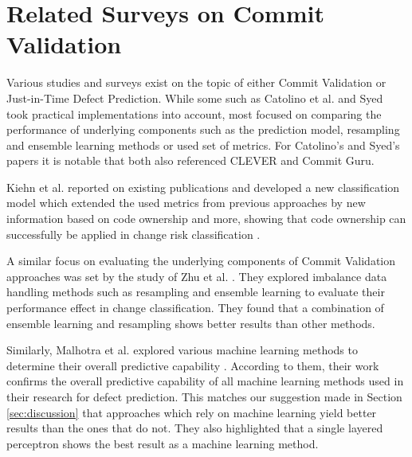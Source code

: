 \section{Related Surveys on Commit Validation}
\label{sec:relatedsurveys}

Various studies and surveys exist
on the topic of either Commit Validation or Just-in-Time Defect Prediction. While some such as Catolino et al. \cite{Catolino2019} and Syed \cite{Syed2019} took practical implementations into account, most focused on comparing the performance of underlying components such as the prediction model, resampling and ensemble learning methods or used set of metrics. For Catolino's and Syed's papers it is notable that both also referenced CLEVER and Commit Guru.

Kiehn et al. reported on existing publications and developed a new classification model which extended the used metrics from previous approaches by new information based on code ownership and more, showing that code ownership can successfully be applied in change risk classification \cite{Kiehn2019}.

A similar focus on evaluating the underlying components of Commit Validation approaches was set by the study of Zhu et al. \cite{Zhu2018}. They explored imbalance data handling methods such as resampling and ensemble learning to evaluate their performance effect in change classification. They found that a combination of ensemble learning and resampling shows better results than other methods. 

Similarly, Malhotra et al. explored various machine learning methods to determine their overall predictive capability \cite{Malhotra2017}. According to them, their work confirms the overall predictive capability of all machine learning methods used in their research for defect prediction. This matches our suggestion made in Section \ref{sec:discussion} that approaches which rely on machine learning yield better results than the ones that do not. They also highlighted that a single layered perceptron shows the best result as a machine learning method.


